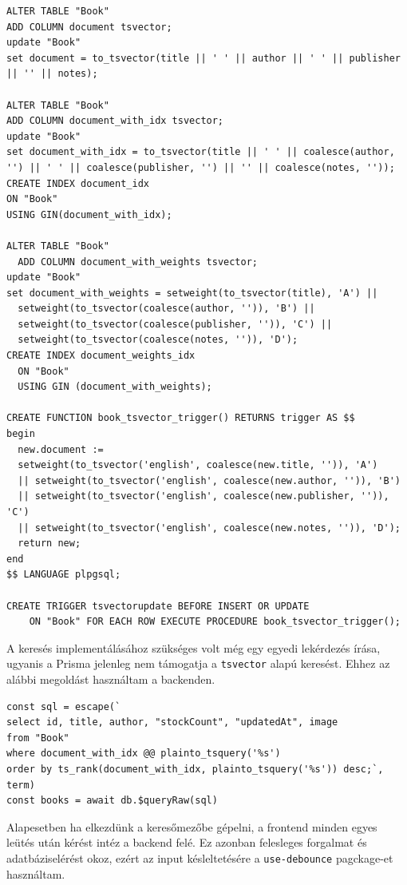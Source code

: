 \begin{lstlisting}[caption=A kereséshez szükséges SQL utasítások]
ALTER TABLE "Book"
ADD COLUMN document tsvector;
update "Book"
set document = to_tsvector(title || ' ' || author || ' ' || publisher || '' || notes);

ALTER TABLE "Book"
ADD COLUMN document_with_idx tsvector;
update "Book"
set document_with_idx = to_tsvector(title || ' ' || coalesce(author, '') || ' ' || coalesce(publisher, '') || '' || coalesce(notes, ''));
CREATE INDEX document_idx
ON "Book"
USING GIN(document_with_idx);

ALTER TABLE "Book"
  ADD COLUMN document_with_weights tsvector;
update "Book"
set document_with_weights = setweight(to_tsvector(title), 'A') ||
  setweight(to_tsvector(coalesce(author, '')), 'B') ||
  setweight(to_tsvector(coalesce(publisher, '')), 'C') ||
  setweight(to_tsvector(coalesce(notes, '')), 'D');
CREATE INDEX document_weights_idx
  ON "Book"
  USING GIN (document_with_weights);

CREATE FUNCTION book_tsvector_trigger() RETURNS trigger AS $$
begin
  new.document :=
  setweight(to_tsvector('english', coalesce(new.title, '')), 'A')
  || setweight(to_tsvector('english', coalesce(new.author, '')), 'B')
  || setweight(to_tsvector('english', coalesce(new.publisher, '')), 'C')
  || setweight(to_tsvector('english', coalesce(new.notes, '')), 'D');
  return new;
end
$$ LANGUAGE plpgsql;

CREATE TRIGGER tsvectorupdate BEFORE INSERT OR UPDATE
    ON "Book" FOR EACH ROW EXECUTE PROCEDURE book_tsvector_trigger();

\end{lstlisting}

A keresés implementálásához szükséges volt még egy egyedi lekérdezés írása, ugyanis a Prisma jelenleg nem támogatja a \lstinline|tsvector|
alapú keresést. Ehhez az alábbi megoldást használtam a backenden.

\begin{lstlisting}[caption=Könyvek közti keresés megvalósítása]
const sql = escape(`
select id, title, author, "stockCount", "updatedAt", image
from "Book"
where document_with_idx @@ plainto_tsquery('%s')
order by ts_rank(document_with_idx, plainto_tsquery('%s')) desc;`, term)
const books = await db.$queryRaw(sql)
\end{lstlisting}

Alapesetben ha elkezdünk a keresőmezőbe gépelni, a frontend minden egyes leütés után kérést intéz a backend felé.
Ez azonban felesleges forgalmat és adatbáziselérést okoz, ezért az input késleltetésére a \lstinline|use-debounce| pagckage-et használtam.

